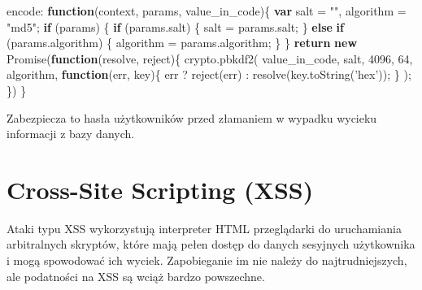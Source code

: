 \documentclass[12pt,polish,a4paper,]{report}
\newenvironment{Shaded}{}{}
\newcommand{\KeywordTok}[1]{\textcolor[rgb]{0.00,0.44,0.13}{\textbf{{#1}}}}
\newcommand{\DecValTok}[1]{\textcolor[rgb]{0.25,0.63,0.44}{{#1}}}
\newcommand{\StringTok}[1]{\textcolor[rgb]{0.25,0.44,0.63}{{#1}}}
\newcommand{\VariableTok}[1]{\textcolor[rgb]{0.10,0.09,0.49}{{#1}}}
\newcommand{\ControlFlowTok}[1]{\textcolor[rgb]{0.00,0.44,0.13}{\textbf{{#1}}}}
\newcommand{\OperatorTok}[1]{\textcolor[rgb]{0.40,0.40,0.40}{{#1}}}
\newcommand{\AttributeTok}[1]{\textcolor[rgb]{0.49,0.56,0.16}{{#1}}}
\newcommand{\NormalTok}[1]{{#1}}
\begin{document}
\begin{Shaded}
\begin{Highlighting}[]
\NormalTok{encode}\OperatorTok{:} \KeywordTok{function}\NormalTok{(context}\OperatorTok{,} \NormalTok{params}\OperatorTok{,} \NormalTok{value_in_code)}\OperatorTok{\{}
    \KeywordTok{var} \NormalTok{salt }\OperatorTok{=} \StringTok{""}\OperatorTok{,} \NormalTok{algorithm }\OperatorTok{=} \StringTok{"md5"}\OperatorTok{;}
    \ControlFlowTok{if} \NormalTok{(params) }\OperatorTok{\{}
        \ControlFlowTok{if} \NormalTok{(}\VariableTok{params}\NormalTok{.}\AttributeTok{salt}\NormalTok{) }\OperatorTok{\{}
            \NormalTok{salt }\OperatorTok{=} \VariableTok{params}\NormalTok{.}\AttributeTok{salt}\OperatorTok{;}
        \OperatorTok{\}}
        \ControlFlowTok{else} \ControlFlowTok{if} \NormalTok{(}\VariableTok{params}\NormalTok{.}\AttributeTok{algorithm}\NormalTok{) }\OperatorTok{\{}
            \NormalTok{algorithm }\OperatorTok{=} \VariableTok{params}\NormalTok{.}\AttributeTok{algorithm}\OperatorTok{;}
        \OperatorTok{\}}
    \OperatorTok{\}}
    \ControlFlowTok{return} \KeywordTok{new} \AttributeTok{Promise}\NormalTok{(}\KeywordTok{function}\NormalTok{(resolve}\OperatorTok{,} \NormalTok{reject)}\OperatorTok{\{}
        \VariableTok{crypto}\NormalTok{.}\AttributeTok{pbkdf2}\NormalTok{(}
            \NormalTok{value_in_code}\OperatorTok{,} \NormalTok{salt}\OperatorTok{,} 
            \DecValTok{4096}\OperatorTok{,} \DecValTok{64}\OperatorTok{,} \NormalTok{algorithm}\OperatorTok{,} 
            \KeywordTok{function}\NormalTok{(err}\OperatorTok{,} \NormalTok{key)}\OperatorTok{\{}
                \NormalTok{err }\OperatorTok{?} \AttributeTok{reject}\NormalTok{(err) : }\AttributeTok{resolve}\NormalTok{(}\VariableTok{key}\NormalTok{.}\AttributeTok{toString}\NormalTok{(}\StringTok{'hex'}\NormalTok{))}\OperatorTok{;}
            \OperatorTok{\}}
        \NormalTok{)}\OperatorTok{;}
    \OperatorTok{\}}\NormalTok{)}
\OperatorTok{\}}
\end{Highlighting}
\end{Shaded}

Zabezpiecza to hasła użytkowników przed złamaniem w wypadku wycieku
informacji z bazy danych.

\chapter{Cross-Site Scripting (XSS)}\label{cross-site-scripting-xss}

Ataki typu XSS wykorzystują interpreter HTML przeglądarki do
uruchamiania arbitralnych skryptów, które mają pełen dostęp do danych
sesyjnych użytkownika i mogą spowodować ich wyciek. Zapobieganie im nie
należy do najtrudniejszych, ale podatności na XSS są wciąż bardzo
powszechne.
\end{document}
